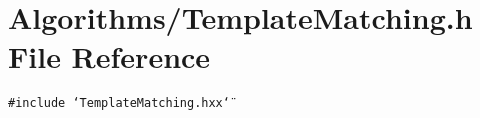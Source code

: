 \section{Algorithms/Template\-Matching.h File Reference}
\label{TemplateMatching_8h}
{\tt \#include \char`\"{}Template\-Matching.hxx\char`\"{}}\par
